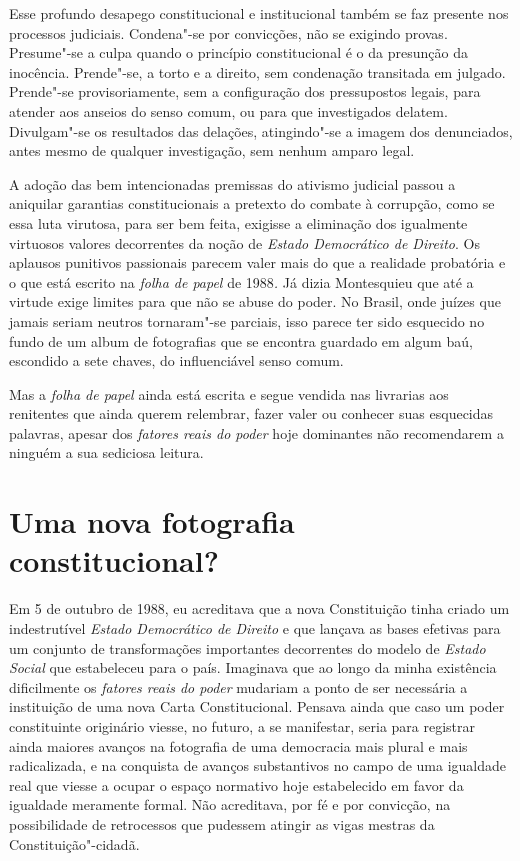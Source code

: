 Esse profundo desapego constitucional e institucional também se faz
presente nos processos judiciais. Condena"-se por convicções, não se
exigindo provas. Presume"-se a culpa quando o princípio constitucional é
o da presunção da inocência. Prende"-se, a torto e a direito, sem
condenação transitada em julgado. Prende"-se provisoriamente, sem a
configuração dos pressupostos legais, para atender aos anseios do senso
comum, ou para que investigados delatem. Divulgam"-se os resultados das
delações, atingindo"-se a imagem dos denunciados, antes mesmo de qualquer
investigação, sem nenhum amparo legal.

A adoção das bem intencionadas premissas do ativismo judicial passou a
aniquilar garantias constitucionais a pretexto do combate à corrupção,
como se essa luta virutosa, para ser bem feita, exigisse a eliminação
dos igualmente virtuosos valores decorrentes da noção de \emph{Estado
Democrático de Direito}. Os aplausos punitivos passionais parecem valer
mais do que a realidade probatória e o que está escrito na \emph{folha
de papel} de 1988\emph{.} Já dizia Montesquieu que até a virtude exige
limites para que não se abuse do poder. No Brasil, onde juízes que
jamais seriam neutros tornaram"-se parciais, isso parece ter sido
esquecido no fundo de um album de fotografias que se encontra guardado
em algum baú, escondido a sete chaves, do influenciável senso comum.

Mas a \emph{folha de papel} ainda está escrita e segue vendida nas
livrarias aos renitentes que ainda querem relembrar, fazer valer ou
conhecer suas esquecidas palavras, apesar dos \emph{fatores reais do
poder} hoje dominantes não recomendarem a ninguém a sua sediciosa
leitura.

\section{Uma nova fotografia constitucional?}

Em 5 de outubro de 1988, eu acreditava que a nova Constituição tinha
criado um indestrutível \emph{Estado Democrático de Direito} e que
lançava as bases efetivas para um conjunto de transformações importantes
decorrentes do modelo de \emph{Estado Social} que estabeleceu para o
país. Imaginava que ao longo da minha existência dificilmente os
\emph{fatores reais do poder} mudariam a ponto de ser necessária a
instituição de uma nova Carta Constitucional. Pensava ainda que caso um
poder constituinte originário viesse, no futuro, a se manifestar, seria
para registrar ainda maiores avanços na fotografia de uma democracia
mais plural e mais radicalizada, e na conquista de avanços substantivos
no campo de uma igualdade real que viesse a ocupar o espaço normativo
hoje estabelecido em favor da igualdade meramente formal. Não
acreditava, por fé e por convicção, na possibilidade de retrocessos que
pudessem atingir as vigas mestras da Constituição"-cidadã.

